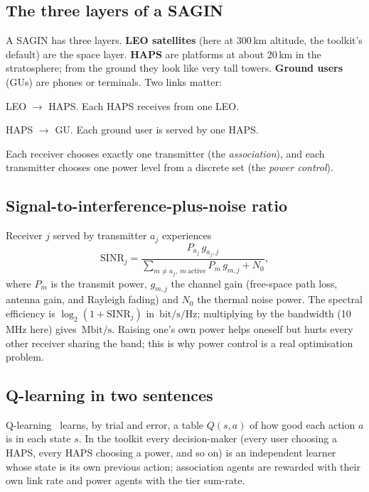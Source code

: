 \documentclass[11pt,a4paper]{article}
\newcommand{\bps}{\,\mathrm{bit/s/Hz}}
\newcommand{\Mbps}{\,\mathrm{Mbit/s}}
\begin{document}
\subsection{The three layers of a SAGIN}
A SAGIN has three layers. \textbf{LEO satellites} (here at 300\,km altitude, the toolkit's default) are the space layer. \textbf{HAPS} are platforms at about 20\,km in the stratosphere; from the ground they look like very tall towers. \textbf{Ground users} (GUs) are phones or terminals. Two links matter:
\begin{description}[leftmargin=0.5cm,labelwidth=0pt]
  \item[Tier 1 (backhaul)] LEO $\rightarrow$ HAPS. Each HAPS receives from one LEO.
  \item[Tier 2 (access)] HAPS $\rightarrow$ GU. Each ground user is served by one HAPS.
\end{description}
Each receiver chooses exactly one transmitter (the \emph{association}), and each transmitter chooses one power level from a discrete set (the \emph{power control}).

\subsection{Signal-to-interference-plus-noise ratio}
Receiver $j$ served by transmitter $a_j$ experiences
\begin{equation}
  \mathrm{SINR}_j=\frac{P_{a_j}\,g_{a_j,j}}{\sum_{m\neq a_j,\ m\ \text{active}} P_m\,g_{m,j}+N_0},
  \label{eq:sinr}
\end{equation}
where $P_m$ is the transmit power, $g_{m,j}$ the channel gain (free-space path loss, antenna gain, and Rayleigh fading) and $N_0$ the thermal noise power. The spectral efficiency is $\log_2(1+\mathrm{SINR}_j)$ in $\bps$; multiplying by the bandwidth (10\,MHz here) gives $\Mbps$. Raising one's own power helps oneself but hurts every other receiver sharing the band; this is why power control is a real optimisation problem.

\subsection{Q-learning in two sentences}
Q-learning~\cite{sutton2018} learns, by trial and error, a table $Q(s,a)$ of how good each action $a$ is in each state $s$. In the toolkit every decision-maker (every user choosing a HAPS, every HAPS choosing a power, and so on) is an independent learner whose state is its own previous action; association agents are rewarded with their own link rate and power agents with the tier sum-rate.
\end{document}
